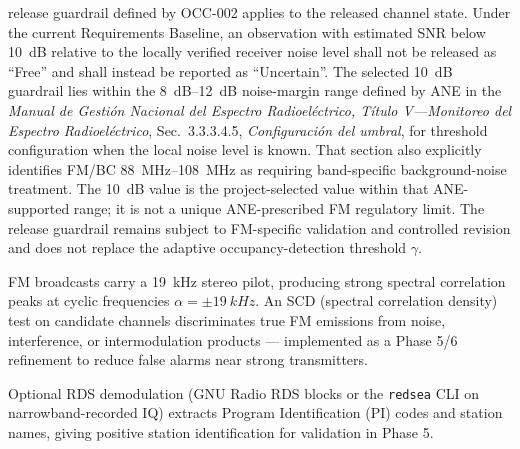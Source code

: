 \documentclass[12pt,a4paper]{report}
\begin{document}
\begin{description}
	release guardrail defined by OCC-002 applies to the released channel state.
	Under the current Requirements Baseline, an observation with estimated SNR
	below \SI{10}{dB} relative to the locally verified receiver noise level
	shall not be released as ``Free'' and shall instead be reported as
	``Uncertain''. The selected \SI{10}{dB} guardrail lies within the
	\SIrange{8}{12}{dB} noise-margin range defined by ANE in the
	\textit{Manual de Gestión Nacional del Espectro Radioeléctrico,
	Título V---Monitoreo del Espectro Radioeléctrico},
	Sec.~3.3.3.4.5, \textit{Configuración del umbral}, for threshold
	configuration when the local noise level is known. That section also
	explicitly identifies FM/BC \SIrange{88}{108}{MHz} as requiring
	band-specific background-noise treatment. The \SI{10}{dB} value is the
	project-selected value within that ANE-supported range; it is not a unique
	ANE-prescribed FM regulatory limit. The release guardrail remains subject
	to FM-specific validation and controlled revision and does not replace the
	adaptive occupancy-detection threshold $\gamma$.
	\item[Upgrade path: cyclostationary detection] FM broadcasts carry a \SI{19}{kHz} stereo pilot, producing strong spectral
 	correlation peaks at cyclic frequencies $\alpha = \pm \SI{19}{kHz}$. An SCD
 	(spectral correlation density) test on candidate channels discriminates true
 	FM emissions from noise, interference, or intermodulation products ---
 	implemented as a Phase 5/6 refinement to reduce false alarms near strong
 	transmitters.
 	\item[Station identification (ground truth).] Optional RDS demodulation (GNU Radio RDS blocks or the \texttt{redsea} CLI on
 	narrowband-recorded IQ) extracts Program Identification (PI) codes and station
 	names, giving positive station identification for validation in Phase 5.
 \end{description}
\end{document}
